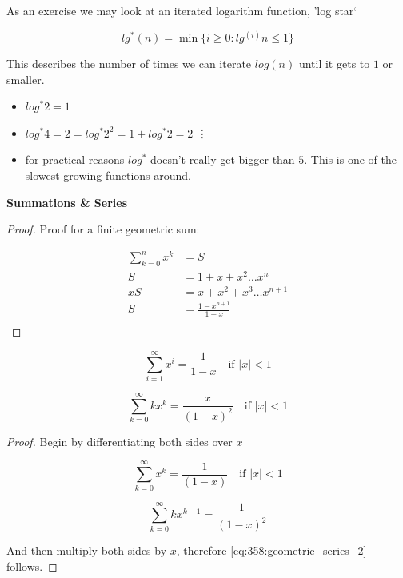 \documentclass[../notes.tex]{subfiles}
\begin{document}
As an exercise we may look at an iterated logarithm function, 'log star`

\begin{equation}
	lg^*(n) = \min\{ i \ge  0 : lg^{(i)} n \le  1 \}
	\label{eq:358:iterated_logarithm}
\end{equation}

This describes the number of times we can iterate $ log(n) $ until it gets to $ 1 $ or smaller.

\begin{itemize}
	\item $ log^*2 = 1 $ 
	\item $ log^*4 = 2 = log^*2^2 = 1 + log^*2 = 2 $ 
		\vdots
	\item for practical reasons $ log^* $  doesn't really get bigger than $ 5 $. This is one of the slowest growing functions around.
\end{itemize}


\textbf{Summations \& Series} 

\begin{proof}

	Proof for a finite geometric sum:

	\begin{equation}
		\begin{split}
			\sum^n_{k=0} x^k &= S \\
			 S &= 1 + x + x^2 \ldots x^n  \\
			 xS &= x + x^2 + x^3 \ldots x^{n+1} \\
			 S &= \frac{1-x^{n+1}}{1-x} \\
		\end{split}
	\end{equation}
\end{proof}


\begin{equation}
	\sum^\infty_{i=1} x^i = \frac{1}{1-x} \quad \text{if } |x| < 1
	\label{eq:358:decreasing_geometric_series}
\end{equation}

\begin{equation}
	\sum^\infty_{k=0} kx^k = \frac{x}{(1-x)^2} \quad \text{if } |x| < 1
	\label{eq:358:geometric_series_2}
\end{equation}

\begin{proof}

	Begin by differentiating both sides over $ x $ 

	\begin{equation}
		\sum^\infty_{k=0} x^k = \frac{1}{(1-x)} \quad \text{if } |x| < 1
	\end{equation}

	\begin{equation}
		\sum^{\infty}_{k=0} kx^{k-1} = \frac{1}{(1-x)^2}
	\end{equation}

	And then multiply both sides by $ x $, therefore \eqref{eq:358:geometric_series_2} follows.
\end{proof}
\end{document}
